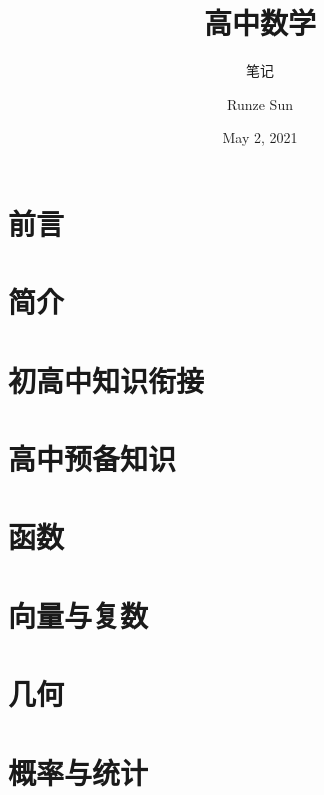 \documentclass[cn,10pt,math=newtx,citestyle=gb7714-2015,bibstyle=gb7714-2015]{elegantbook}
\title{高中数学}
\subtitle{笔记}
\author{Runze Sun}
\institute{LearAwesome}
\date{May 2, 2021}
\begin{document}
\maketitle
\frontmatter

\chapter*{前言}


\newpage
\chapter*{简介}



\tableofcontents

\mainmatter

\chapter{初高中知识衔接}


\chapter{高中预备知识}


\chapter{函数}


\chapter{向量与复数}


\chapter{几何}


\chapter{概率与统计}

\end{document}
